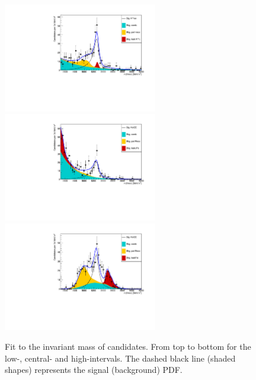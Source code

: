 \begin{figure}[h!]
\centering
\includegraphics[width=0.6\textwidth]{RKst/figs/Fit/fit_EE/fit_EEl.pdf}
\includegraphics[width=0.6\textwidth]{RKst/figs/Fit/fit_EE/fit_EEc.pdf}
\includegraphics[width=0.6\textwidth]{RKst/figs/Fit/fit_EE/fit_EEh.pdf}
\caption{Fit to the \mKpiee invariant mass of \BdToKstee candidates. From top to bottom for the low-, central-
and high-\qsq intervals. The dashed black line (shaded shapes) represents the signal (background) PDF.}
\label{fig:fitsEE}
\end{figure}
%
